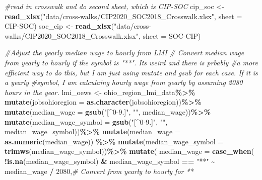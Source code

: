 \documentclass[
]{article}
\newenvironment{Shaded}{\begin{snugshade}}{\end{snugshade}}
\newcommand{\AttributeTok}[1]{\textcolor[rgb]{0.13,0.29,0.53}{#1}}
\newcommand{\CommentTok}[1]{\textcolor[rgb]{0.56,0.35,0.01}{\textit{#1}}}
\newcommand{\DecValTok}[1]{\textcolor[rgb]{0.00,0.00,0.81}{#1}}
\newcommand{\FunctionTok}[1]{\textcolor[rgb]{0.13,0.29,0.53}{\textbf{#1}}}
\newcommand{\NormalTok}[1]{#1}
\newcommand{\OtherTok}[1]{\textcolor[rgb]{0.56,0.35,0.01}{#1}}
\newcommand{\SpecialCharTok}[1]{\textcolor[rgb]{0.81,0.36,0.00}{\textbf{#1}}}
\newcommand{\StringTok}[1]{\textcolor[rgb]{0.31,0.60,0.02}{#1}}
\begin{document}
\begin{Shaded}
\begin{Highlighting}[]
\CommentTok{\#read in crosswalk and do second sheet, which is CIP{-}SOC}
\NormalTok{cip\_soc }\OtherTok{\textless{}{-}} \FunctionTok{read\_xlsx}\NormalTok{(}\StringTok{"data/cross{-}walks/CIP2020\_SOC2018\_Crosswalk.xlsx"}\NormalTok{, }\AttributeTok{sheet =} \StringTok{\textquotesingle{}CIP{-}SOC\textquotesingle{}}\NormalTok{)}
\NormalTok{soc\_cip }\OtherTok{\textless{}{-}} \FunctionTok{read\_xlsx}\NormalTok{(}\StringTok{"data/cross{-}walks/CIP2020\_SOC2018\_Crosswalk.xlsx"}\NormalTok{, }\AttributeTok{sheet =} \StringTok{\textquotesingle{}SOC{-}CIP\textquotesingle{}}\NormalTok{)}

\CommentTok{\#Adjust the yearly median wage to hourly from LMI}
\CommentTok{\# Convert median wage from yearly to hourly if the symbol is "**". It\textquotesingle{}s weird and there is prbably}
\CommentTok{\#a more efficient way to do this, but I am just using mutate and gsub for each case. If it is a yearly }
\CommentTok{\#symbol, I am calculaing hourly wage from yearly by assuming 2080 hours in the year. }
\NormalTok{lmi\_oews }\OtherTok{\textless{}{-}}\NormalTok{ ohio\_region\_lmi\_data}\SpecialCharTok{\%\textgreater{}\%}
  \FunctionTok{mutate}\NormalTok{(}\AttributeTok{jobsohioregion =} \FunctionTok{as.character}\NormalTok{(jobsohioregion))}\SpecialCharTok{\%\textgreater{}\%}
  \FunctionTok{mutate}\NormalTok{(}\AttributeTok{median\_wage =} \FunctionTok{gsub}\NormalTok{(}\StringTok{"[\^{}0{-}9.]"}\NormalTok{, }\StringTok{""}\NormalTok{, median\_wage))}\SpecialCharTok{\%\textgreater{}\%}
  \FunctionTok{mutate}\NormalTok{(}\AttributeTok{median\_wage\_symbol =} \FunctionTok{gsub}\NormalTok{(}\StringTok{"[\^{}0{-}9.]"}\NormalTok{, }\StringTok{""}\NormalTok{, median\_wage\_symbol))}\SpecialCharTok{\%\textgreater{}\%}
  \FunctionTok{mutate}\NormalTok{(}\AttributeTok{median\_wage =} \FunctionTok{as.numeric}\NormalTok{(median\_wage)) }\SpecialCharTok{\%\textgreater{}\%}
  \FunctionTok{mutate}\NormalTok{(}\AttributeTok{median\_wage\_symbol =} \FunctionTok{trimws}\NormalTok{(median\_wage\_symbol))}\SpecialCharTok{\%\textgreater{}\%}
  \FunctionTok{mutate}\NormalTok{(}
    \AttributeTok{median\_wage =} \FunctionTok{case\_when}\NormalTok{(}
       \SpecialCharTok{!}\FunctionTok{is.na}\NormalTok{(median\_wage\_symbol) }\SpecialCharTok{\&}\NormalTok{ median\_wage\_symbol }\SpecialCharTok{==} \StringTok{"**"} \SpecialCharTok{\textasciitilde{}}\NormalTok{ median\_wage }\SpecialCharTok{/} \DecValTok{2080}\NormalTok{,}\CommentTok{\# Convert from yearly to hourly for \textquotesingle{}**\textquotesingle{}}

\end{Highlighting}
\end{Shaded}
\end{document}
